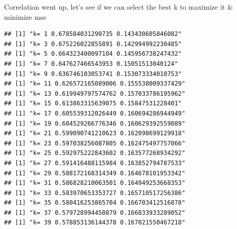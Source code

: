 \documentclass[
]{article}
\newenvironment{Shaded}{\begin{snugshade}}{\end{snugshade}}
\newcommand{\AttributeTok}[1]{\textcolor[rgb]{0.77,0.63,0.00}{#1}}
\newcommand{\ControlFlowTok}[1]{\textcolor[rgb]{0.13,0.29,0.53}{\textbf{#1}}}
\newcommand{\DecValTok}[1]{\textcolor[rgb]{0.00,0.00,0.81}{#1}}
\newcommand{\FunctionTok}[1]{\textcolor[rgb]{0.00,0.00,0.00}{#1}}
\newcommand{\NormalTok}[1]{#1}
\newcommand{\OtherTok}[1]{\textcolor[rgb]{0.56,0.35,0.01}{#1}}
\newcommand{\SpecialCharTok}[1]{\textcolor[rgb]{0.00,0.00,0.00}{#1}}
\newcommand{\StringTok}[1]{\textcolor[rgb]{0.31,0.60,0.02}{#1}}
\begin{document}
Correlation went up, let's see if we can select the best k to maximize
it \& minimize mse

\begin{Shaded}
\end{Shaded}

\begin{verbatim}
## [1] "k= 1 0.678584031290735 0.143430605846082"
## [1] "k= 3 0.675226022855891 0.142994992230485"
## [1] "k= 5 0.664323400097104 0.145956738247432"
## [1] "k= 7 0.647627466543953 0.15051513040124"
## [1] "k= 9 0.636746103053741 0.153073334010753"
## [1] "k= 11 0.626572165089006 0.155538009337429"
## [1] "k= 13 0.619949797574762 0.157033786195962"
## [1] "k= 15 0.613863315639075 0.15847531228401"
## [1] "k= 17 0.605539312026449 0.160694286944949"
## [1] "k= 19 0.604529266776346 0.160629392559089"
## [1] "k= 21 0.599090741210623 0.162098699129918"
## [1] "k= 23 0.597038256087805 0.162475497757066"
## [1] "k= 25 0.592975222843602 0.163577268934292"
## [1] "k= 27 0.591416488115984 0.163852794787533"
## [1] "k= 29 0.588172168314349 0.164678101953342"
## [1] "k= 31 0.586828210063501 0.164949253668353"
## [1] "k= 33 0.583970653353727 0.165710517256386"
## [1] "k= 35 0.580416253865704 0.166703412516878"
## [1] "k= 37 0.579728994450879 0.166833933289052"
## [1] "k= 39 0.578853136144378 0.167021550467218"
\end{verbatim}
\end{document}

